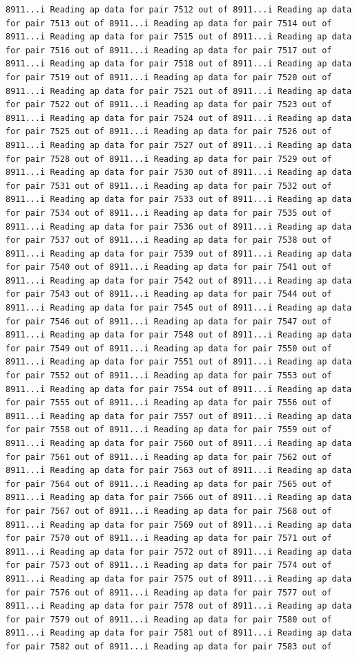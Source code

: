 \documentclass[
]{article}
\begin{document}
\begin{verbatim}
8911...i Reading ap data for pair 7512 out of 8911...i Reading ap data for pair 7513 out of 8911...i Reading ap data for pair 7514 out of 8911...i Reading ap data for pair 7515 out of 8911...i Reading ap data for pair 7516 out of 8911...i Reading ap data for pair 7517 out of 8911...i Reading ap data for pair 7518 out of 8911...i Reading ap data for pair 7519 out of 8911...i Reading ap data for pair 7520 out of 8911...i Reading ap data for pair 7521 out of 8911...i Reading ap data for pair 7522 out of 8911...i Reading ap data for pair 7523 out of 8911...i Reading ap data for pair 7524 out of 8911...i Reading ap data for pair 7525 out of 8911...i Reading ap data for pair 7526 out of 8911...i Reading ap data for pair 7527 out of 8911...i Reading ap data for pair 7528 out of 8911...i Reading ap data for pair 7529 out of 8911...i Reading ap data for pair 7530 out of 8911...i Reading ap data for pair 7531 out of 8911...i Reading ap data for pair 7532 out of 8911...i Reading ap data for pair 7533 out of 8911...i Reading ap data for pair 7534 out of 8911...i Reading ap data for pair 7535 out of 8911...i Reading ap data for pair 7536 out of 8911...i Reading ap data for pair 7537 out of 8911...i Reading ap data for pair 7538 out of 8911...i Reading ap data for pair 7539 out of 8911...i Reading ap data for pair 7540 out of 8911...i Reading ap data for pair 7541 out of 8911...i Reading ap data for pair 7542 out of 8911...i Reading ap data for pair 7543 out of 8911...i Reading ap data for pair 7544 out of 8911...i Reading ap data for pair 7545 out of 8911...i Reading ap data for pair 7546 out of 8911...i Reading ap data for pair 7547 out of 8911...i Reading ap data for pair 7548 out of 8911...i Reading ap data for pair 7549 out of 8911...i Reading ap data for pair 7550 out of 8911...i Reading ap data for pair 7551 out of 8911...i Reading ap data for pair 7552 out of 8911...i Reading ap data for pair 7553 out of 8911...i Reading ap data for pair 7554 out of 8911...i Reading ap data for pair 7555 out of 8911...i Reading ap data for pair 7556 out of 8911...i Reading ap data for pair 7557 out of 8911...i Reading ap data for pair 7558 out of 8911...i Reading ap data for pair 7559 out of 8911...i Reading ap data for pair 7560 out of 8911...i Reading ap data for pair 7561 out of 8911...i Reading ap data for pair 7562 out of 8911...i Reading ap data for pair 7563 out of 8911...i Reading ap data for pair 7564 out of 8911...i Reading ap data for pair 7565 out of 8911...i Reading ap data for pair 7566 out of 8911...i Reading ap data for pair 7567 out of 8911...i Reading ap data for pair 7568 out of 8911...i Reading ap data for pair 7569 out of 8911...i Reading ap data for pair 7570 out of 8911...i Reading ap data for pair 7571 out of 8911...i Reading ap data for pair 7572 out of 8911...i Reading ap data for pair 7573 out of 8911...i Reading ap data for pair 7574 out of 8911...i Reading ap data for pair 7575 out of 8911...i Reading ap data for pair 7576 out of 8911...i Reading ap data for pair 7577 out of 8911...i Reading ap data for pair 7578 out of 8911...i Reading ap data for pair 7579 out of 8911...i Reading ap data for pair 7580 out of 8911...i Reading ap data for pair 7581 out of 8911...i Reading ap data for pair 7582 out of 8911...i Reading ap data for pair 7583 out of 
\end{verbatim}
\end{document}
